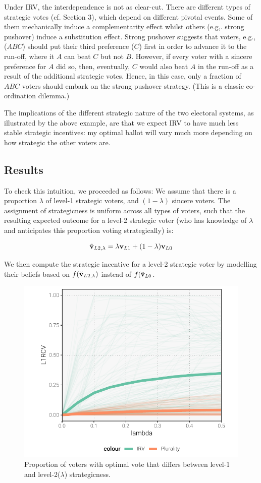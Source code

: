 \documentclass[12pt, letter]{article}
\begin{document}
Under IRV, the interdependence is not as clear-cut. There are different types of strategic votes (cf. Section 3), which depend on different pivotal events. Some of them mechanically induce a complementarity effect whilst others (e.g,. strong pushover) induce a substitution effect. Strong pushover suggests that voters, e.g., ($ABC$) should put their third preference ($C$) first in order to advance it to the run-off, where it $A$ can beat $C$ but not $B$. However, if every voter with a sincere preference for $A$ did so, then, eventually, $C$
would also beat $A$ in the run-off as a result of the additional strategic votes. Hence, in this case, only a fraction of $ABC$ voters should embark on the strong pushover strategy. (This is a classic co-ordination dilemma.)

The implications of the different strategic nature of the two electoral systems, as illustrated by the above example, are that we expect IRV to have much less stable strategic incentives: my optimal ballot will vary much more depending on how strategic the other voters are.

\subsection{Results}

To check this intuition, we proceeded as follows: We assume that there is a proportion $\lambda$ of level-1 strategic voters, and $(1 - \lambda)$ sincere voters. The assignment of strategicness is uniform across all types of voters, such that the resulting expected outcome for a level-2 strategic voter (who has knowledge of $\lambda$ and anticipates this proportion voting strategically) is:

\begin{equation*}
	\tilde{\bf v}_{L2, \lambda} = \lambda {\bf v}_{L1} + (1 - \lambda) {\bf v}_{L0} 
\end{equation*}

We then compute the strategic incentive for a level-2 strategic voter by modelling their beliefs based on $f(\tilde{\bf v}_{L2, \lambda})$ instead of $f(\tilde{\bf v}_{L0}$.

\begin{figure}[!htb]
	\centering
	\includegraphics[width = 0.6 \textwidth]{../output/figures/cses_l1.pdf}
	\caption{Proportion of voters with optimal vote that differs between level-1 and level-2($\lambda$) strategicness.}
	\label{fig:sv_l1}
\end{figure}
\end{document}
